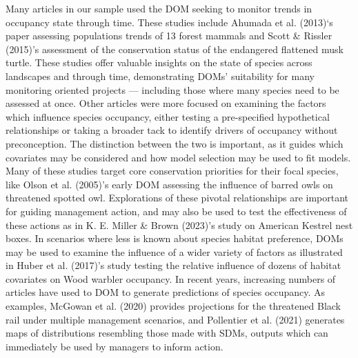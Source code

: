 \documentclass[
]{article}
\begin{document}
Many articles in our sample used the DOM seeking to monitor trends in
occupancy state through time. These studies include Ahumada et al.
(2013)`s paper assessing populations trends of 13 forest mammals and
Scott \& Rissler (2015)'s assessment of the conservation status of the
endangered flattened musk turtle. These studies offer valuable insights
on the state of species across landscapes and through time,
demonstrating DOMs' suitability for many monitoring oriented projects
--- including those where many species need to be assessed at once.
Other articles were more focused on examining the factors which
influence species occupancy, either testing a pre-specified hypothetical
relationships or taking a broader tack to identify drivers of occupancy
without preconception. The distinction between the two is important, as
it guides which covariates may be considered and how model selection may
be used to fit models. Many of these studies target core conservation
priorities for their focal species, like Olson et al. (2005)'s early DOM
assessing the influence of barred owls on threatened spotted owl.
Explorations of these pivotal relationships are important for guiding
management action, and may also be used to test the effectiveness of
these actions as in K. E. Miller \& Brown (2023)'s study on American
Kestrel nest boxes. In scenarios where less is known about species
habitat preference, DOMs may be used to examine the influence of a wider
variety of factors as illustrated in Huber et al. (2017)'s study testing
the relative influence of dozens of habitat covariates on Wood warbler
occupancy. In recent years, increasing numbers of articles have used to
DOM to generate predictions of species occupancy. As examples, McGowan
et al. (2020) provides projections for the threatened Black rail under
multiple management scenarios, and Pollentier et al. (2021) generates
maps of distributions resembling those made with SDMs, outputs which can
immediately be used by managers to inform action.
\end{document}
